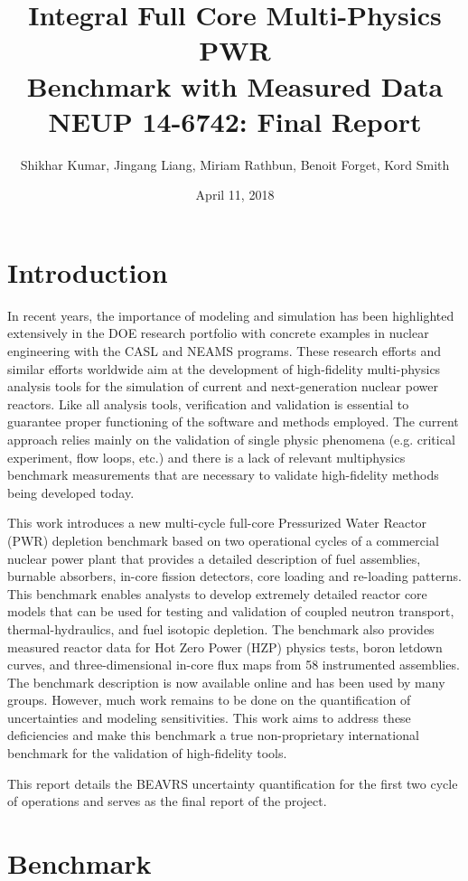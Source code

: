 \documentclass{article}
\title{Integral Full Core Multi-Physics PWR \\
Benchmark with Measured Data \\
NEUP 14-6742: Final Report}
\author{Shikhar Kumar, Jingang Liang, Miriam Rathbun, Benoit Forget, Kord Smith}
\date{April 11, 2018}
\begin{document}
\maketitle

\section{Introduction}

In recent years, the importance of modeling and simulation has been highlighted extensively in the DOE research portfolio with concrete examples in nuclear engineering with the CASL and NEAMS programs.  These research efforts and similar efforts worldwide aim at the development of high-fidelity multi-physics analysis tools for the simulation of current and next-generation nuclear power reactors.  Like all analysis tools, verification and validation is essential to guarantee proper functioning of the software and methods employed.  The current approach relies mainly on the validation of single physic phenomena (e.g. critical experiment, flow loops, etc.) and there is a lack of relevant multiphysics benchmark measurements that are necessary to validate high-fidelity methods being developed today.

This work introduces a new multi-cycle full-core Pressurized Water Reactor (PWR) depletion benchmark based on two operational cycles of a commercial nuclear power plant that provides a detailed description of fuel assemblies, burnable absorbers, in-core fission detectors, core loading and re-loading patterns. This benchmark enables analysts to develop extremely detailed reactor core models that can be used for testing and validation of coupled neutron transport, thermal-hydraulics, and fuel isotopic depletion. The benchmark also provides measured reactor data for Hot Zero Power (HZP) physics tests, boron letdown curves, and three-dimensional in-core flux maps from 58 instrumented assemblies.  The benchmark description is now available online and has been used by many groups. However, much work remains to be done on the quantification of uncertainties and modeling sensitivities.  This work aims to address these deficiencies and make this benchmark a true non-proprietary international benchmark for the validation of high-fidelity tools.

This report details the BEAVRS uncertainty quantification for the first two cycle of operations and serves as the final report of the project.

\section{Benchmark}
\end{document}
